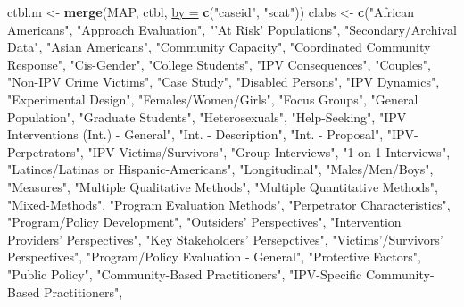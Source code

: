 \documentclass[]{tufte-handout}
\newenvironment{Shaded}{}{}
\newcommand{\KeywordTok}[1]{\textbf{{#1}}}
\newcommand{\DataTypeTok}[1]{\underline{{#1}}}
\newcommand{\StringTok}[1]{{#1}}
\newcommand{\NormalTok}[1]{{#1}}
\begin{document}
\begin{Shaded}
\begin{Highlighting}[]
\NormalTok{ctbl.m <-}\StringTok{ }\KeywordTok{merge}\NormalTok{(MAP, ctbl, }\DataTypeTok{by =} \KeywordTok{c}\NormalTok{(}\StringTok{"caseid"}\NormalTok{, }\StringTok{"scat"}\NormalTok{))}
\NormalTok{clabs <-}\StringTok{ }\KeywordTok{c}\NormalTok{(}\StringTok{"African Americans"}\NormalTok{, }\StringTok{"Approach Evaluation"}\NormalTok{, }\StringTok{"'At Risk' Populations"}\NormalTok{, }
    \StringTok{"Secondary/Archival Data"}\NormalTok{, }\StringTok{"Asian Americans"}\NormalTok{, }\StringTok{"Community Capacity"}\NormalTok{, }
    \StringTok{"Coordinated Community Response"}\NormalTok{, }\StringTok{"Cis-Gender"}\NormalTok{, }\StringTok{"College Students"}\NormalTok{, }
    \StringTok{"IPV Consequences"}\NormalTok{, }\StringTok{"Couples"}\NormalTok{, }\StringTok{"Non-IPV Crime Victims"}\NormalTok{, }\StringTok{"Case Study"}\NormalTok{, }
    \StringTok{"Disabled Persons"}\NormalTok{, }\StringTok{"IPV Dynamics"}\NormalTok{, }\StringTok{"Experimental Design"}\NormalTok{, }
    \StringTok{"Females/Women/Girls"}\NormalTok{, }\StringTok{"Focus Groups"}\NormalTok{, }\StringTok{"General Population"}\NormalTok{, }
    \StringTok{"Graduate Students"}\NormalTok{, }\StringTok{"Heterosexuals"}\NormalTok{, }\StringTok{"Help-Seeking"}\NormalTok{, }\StringTok{"IPV Interventions (Int.) - General"}\NormalTok{, }
    \StringTok{"Int. - Description"}\NormalTok{, }\StringTok{"Int. - Proposal"}\NormalTok{, }\StringTok{"IPV-Perpetrators"}\NormalTok{, }
    \StringTok{"IPV-Victims/Survivors"}\NormalTok{, }\StringTok{"Group Interviews"}\NormalTok{, }\StringTok{"1-on-1 Interviews"}\NormalTok{, }
    \StringTok{"Latinos/Latinas or Hispanic-Americans"}\NormalTok{, }\StringTok{"Longitudinal"}\NormalTok{, }
    \StringTok{"Males/Men/Boys"}\NormalTok{, }\StringTok{"Measures"}\NormalTok{, }\StringTok{"Multiple Qualitative Methods"}\NormalTok{, }
    \StringTok{"Multiple Quantitative Methods"}\NormalTok{, }\StringTok{"Mixed-Methods"}\NormalTok{, }\StringTok{"Program Evaluation Methods"}\NormalTok{, }
    \StringTok{"Perpetrator Characteristics"}\NormalTok{, }\StringTok{"Program/Policy Development"}\NormalTok{, }
    \StringTok{"Outsiders' Perspectives"}\NormalTok{, }\StringTok{"Intervention Providers' Perspectives"}\NormalTok{, }
    \StringTok{"Key Stakeholders' Persepctives"}\NormalTok{, }\StringTok{"Victims'/Survivors' Perspectives"}\NormalTok{, }
    \StringTok{"Program/Policy Evaluation - General"}\NormalTok{, }\StringTok{"Protective Factors"}\NormalTok{, }
    \StringTok{"Public Policy"}\NormalTok{, }\StringTok{"Community-Based Practitioners"}\NormalTok{, }\StringTok{"IPV-Specific Community-Based Practitioners"}\NormalTok{, }

\end{Highlighting}
\end{Shaded}
\end{document}
